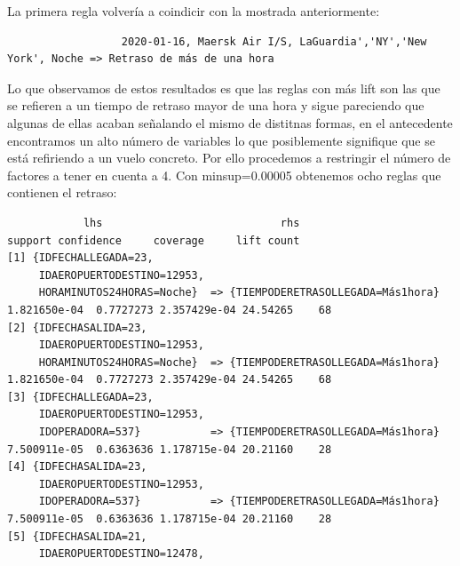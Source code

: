 \documentclass{article}
\begin{document}
La primera regla volvería a coindicir con la mostrada anteriormente:
\begin{lstlisting}
                  2020-01-16, Maersk Air I/S, LaGuardia','NY','New York', Noche => Retraso de más de una hora
\end{lstlisting}
Lo que observamos de estos resultados es que las reglas con más lift son las que se refieren a un tiempo de retraso mayor de una hora y sigue pareciendo que algunas de ellas acaban señalando el mismo de distitnas formas, en el antecedente encontramos un alto número de variables lo que posiblemente signifique que se está refiriendo a un vuelo concreto. Por ello procedemos a restringir el número de factores a tener en cuenta a 4. Con minsup=0.00005 obtenemos ocho reglas que contienen el retraso:
\begin{lstlisting}
            lhs                            rhs                                    support confidence     coverage     lift count
[1] {IDFECHALLEGADA=23,                                                                                                 
     IDAEROPUERTODESTINO=12953,                                                                                         
     HORAMINUTOS24HORAS=Noche}  => {TIEMPODERETRASOLLEGADA=Más1hora} 1.821650e-04  0.7727273 2.357429e-04 24.54265    68
[2] {IDFECHASALIDA=23,                                                                                                  
     IDAEROPUERTODESTINO=12953,                                                                                         
     HORAMINUTOS24HORAS=Noche}  => {TIEMPODERETRASOLLEGADA=Más1hora} 1.821650e-04  0.7727273 2.357429e-04 24.54265    68
[3] {IDFECHALLEGADA=23,                                                                                                 
     IDAEROPUERTODESTINO=12953,                                                                                         
     IDOPERADORA=537}           => {TIEMPODERETRASOLLEGADA=Más1hora} 7.500911e-05  0.6363636 1.178715e-04 20.21160    28
[4] {IDFECHASALIDA=23,                                                                                                  
     IDAEROPUERTODESTINO=12953,                                                                                         
     IDOPERADORA=537}           => {TIEMPODERETRASOLLEGADA=Más1hora} 7.500911e-05  0.6363636 1.178715e-04 20.21160    28
[5] {IDFECHASALIDA=21,                                                                                                  
     IDAEROPUERTODESTINO=12478,                                                                                         

\end{lstlisting}
\end{document}
